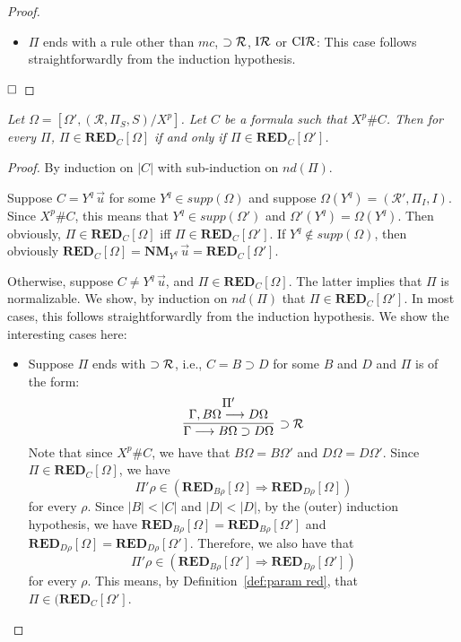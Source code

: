\documentclass[preprint]{elsarticle}
\def\Rscr{{\mathcal R}}
\newcommand{\Seq}[2]{#1\longrightarrow #2}
\newcommand{\indR}{{\rm I}{\cal R}}
\newcommand{\coindR}{{\rm CI}{\cal R}}
\newcommand{\oimpR}{\oimp{\cal R}}
\newcommand{\oimp}{\supset}
\def\RED{{\mathbf{RED}}}
\def\NM{{\mathbf{NM}}}
\def\qed{$\hfill\Box$}
\newenvironment{lemmacp}[1]{\noindent {\bf Lemma~\ref{#1}.} \em}{}
\begin{document}
\begin{proof}
\begin{itemize}
\item $\Pi$ ends with a rule other than $mc$, $\oimpR$, $\indR$ or $\coindR$:
This case follows straightforwardly from the induction hypothesis.
\end{itemize}
\qed
\end{proof}


\begin{lemmacp}{lm:red vacuous}
Let $\Omega = [\Omega', (\Rscr, \Pi_S, S)/ X^p]$.
Let $C$ be a formula such that $X^p \# C$. 
Then for every $\Pi$,  $\Pi \in \RED_C[\Omega]$ if and only if
$\Pi \in \RED_C[\Omega']$. 
\end{lemmacp}
\begin{proof}
By induction on $|C|$ with sub-induction on $nd(\Pi)$. 

Suppose $C = Y^q\,\vec u$ for some $Y^q \in supp(\Omega)$ 
and suppose $\Omega(Y^q) = (\Rscr', \Pi_I, I)$. Since $X^p \# C$,
this means that $Y^q \in supp(\Omega')$ and $\Omega'(Y^q) = \Omega(Y^q)$. 
Then obviously, $\Pi \in \RED_C[\Omega]$ iff $\Pi \in \RED_C[\Omega']$. 
If $Y^q \not \in supp(\Omega)$, then
obviously $\RED_C[\Omega] = \NM_{Y^q}\,\vec u = \RED_C[\Omega']$. 

Otherwise, suppose $C \not = Y^q\,\vec u$, and  $\Pi \in \RED_C[\Omega]$. 
The latter implies that $\Pi$ is normalizable.
We show, by induction on $nd(\Pi)$ that $\Pi \in \RED_C[\Omega']$. 
In most cases, this follows straightforwardly from the induction
hypothesis. We show the interesting cases here:
\begin{itemize}
\item Suppose $\Pi$ ends with $\oimpR$, i.e., $C = B \oimp D$ for some $B$ and $D$
and $\Pi$ is of the form:
$$
\infer[\oimpR]
{\Seq{\Gamma}{B\Omega \oimp D\Omega}}
{
 \deduce{\Seq{\Gamma, B\Omega}{D\Omega}}{\Pi'}
}
$$
Note that since $X^p \# C$, we have that $B\Omega=B\Omega'$ and
$D\Omega = D\Omega'$. 
Since $\Pi \in \RED_C[\Omega]$, we have
$$
\Pi'\rho \in (\RED_{B\rho}[\Omega] \Rightarrow \RED_{D\rho}[\Omega])
$$
for every $\rho$. 
Since $|B| < |C|$ and $|D| < |D|$, by the (outer) induction hypothesis,
we have $\RED_{B\rho}[\Omega] = \RED_{B\rho}[\Omega']$
and $\RED_{D\rho}[\Omega] = \RED_{D\rho}[\Omega']$. 
Therefore, we also have that 
$$
\Pi'\rho \in (\RED_{B\rho}[\Omega'] \Rightarrow \RED_{D\rho}[\Omega'])
$$
for every $\rho$. This means, by Definition~\ref{def:param red}, that 
$\Pi \in (\RED_C[\Omega']$. 


\end{itemize}
\end{proof}
\end{document}
